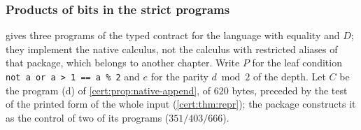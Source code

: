\subsubsection*{Products of bits in the strict programs}

 gives three programs of the typed contract for the
language with equality and $D$; they implement the native calculus, not the
calculus with restricted aliases of that package, which belongs to another
chapter. Write $P$ for the leaf condition \texttt{not a or a > 1 == a \% 2} and
$e$ for the parity $d\bmod 2$ of the depth. Let $C$ be the program (d) of
\cref{cert:prop:native-append}, of $620$ bytes, preceded by the test of the
printed form of the whole input (\cref{cert:thm:repr}); the package constructs
it as the control of two of its programs ($351/403/666$).

